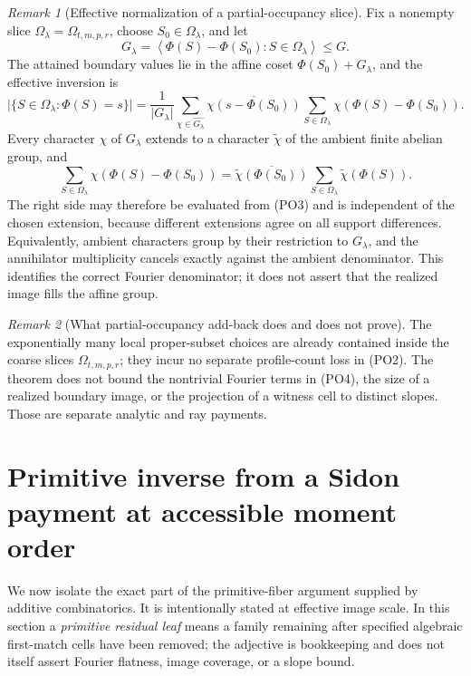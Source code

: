 \documentclass[11pt,a4paper]{amsart}
\numberwithin{equation}{section}
\theoremstyle{remark}
\newtheorem{remark}[remark]{Remark}
\newcommand{\abs}[1]{\lvert #1\rvert}
\begin{document}
\begin{remark}[Effective normalization of a partial-occupancy slice]
Fix a nonempty slice \(\Omega_\lambda=\Omega_{t,m,p,r}\), choose
\(S_0\in\Omega_\lambda\), and let
\[
 G_\lambda=
 \left\langle\Phi(S)-\Phi(S_0):S\in\Omega_\lambda\right\rangle
 \le G.
\]
The attained boundary values lie in the affine coset
\(\Phi(S_0)+G_\lambda\), and the effective inversion is
\[
 \abs{\{S\in\Omega_\lambda:\Phi(S)=s\}}
 =\frac1{\abs{G_\lambda}}
   \sum_{\chi\in\widehat{G_\lambda}}
   \overline{\chi(s-\Phi(S_0))}
   \sum_{S\in\Omega_\lambda}
      \chi(\Phi(S)-\Phi(S_0)).                       \tag{PO5}
\]
Every character \(\chi\) of \(G_\lambda\) extends to a character
\(\widetilde\chi\) of the ambient finite abelian group, and
\[
 \sum_{S\in\Omega_\lambda}\chi(\Phi(S)-\Phi(S_0))
 =\overline{\widetilde\chi(\Phi(S_0))}
   \sum_{S\in\Omega_\lambda}\widetilde\chi(\Phi(S)).
\]
The right side may therefore be evaluated from \textup{(PO3)} and is
independent of the chosen extension, because different extensions agree on
all support differences.  Equivalently, ambient characters group by their restriction
to \(G_\lambda\), and the annihilator multiplicity cancels exactly against
the ambient denominator.  This identifies the correct Fourier denominator;
it does not assert that the realized image fills the affine group.
\end{remark}

\begin{remark}[What partial-occupancy add-back does and does not prove]
The exponentially many local proper-subset choices are already contained
inside the coarse slices \(\Omega_{t,m,p,r}\); they incur no separate
profile-count loss in \textup{(PO2)}.  The theorem does not bound the
nontrivial Fourier terms in \textup{(PO4)}, the size of a realized
boundary image, or the projection of a witness cell to distinct slopes.
Those are separate analytic and ray payments.
\end{remark}


\section{Primitive inverse from a Sidon payment at accessible moment order}
\label{sec:primitive-inverse}

We now isolate the exact part of the primitive-fiber argument supplied by
additive combinatorics.  It is intentionally stated at effective image
scale.  In this section a \emph{primitive residual leaf} means a family
remaining after specified algebraic first-match cells have been removed;
the adjective is bookkeeping and does not itself assert Fourier flatness,
image coverage, or a slope bound.
\end{document}
